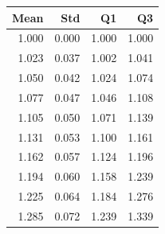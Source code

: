 \begin{tabular}{rrrr}
\toprule
Mean & Std & Q1 & Q3 \\
\midrule
1.000 & 0.000 & 1.000 & 1.000 \\
1.023 & 0.037 & 1.002 & 1.041 \\
1.050 & 0.042 & 1.024 & 1.074 \\
1.077 & 0.047 & 1.046 & 1.108 \\
1.105 & 0.050 & 1.071 & 1.139 \\
1.131 & 0.053 & 1.100 & 1.161 \\
1.162 & 0.057 & 1.124 & 1.196 \\
1.194 & 0.060 & 1.158 & 1.239 \\
1.225 & 0.064 & 1.184 & 1.276 \\
1.285 & 0.072 & 1.239 & 1.339 \\
\bottomrule
\end{tabular}

